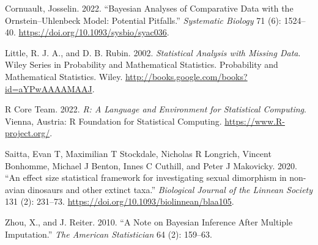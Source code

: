 \documentclass[
  12pt,
]{article}
\newlength{\cslhangindent}
\newlength{\cslentryspacingunit} %
\newenvironment{CSLReferences}[2] %
 {%
  \setlength{\parindent}{0pt}
  \ifodd #1
  \let\oldpar\par
  \def\par{\hangindent=\cslhangindent\oldpar}
  \fi
  \setlength{\parskip}{#2\cslentryspacingunit}
 }%
 {}
\begin{document}
\hypertarget{refs}{}
\begin{CSLReferences}{1}{0}
\leavevmode{}%
Cornuault, Josselin. 2022. {``{Bayesian Analyses of Comparative Data
with the Ornstein--Uhlenbeck Model: Potential Pitfalls}.''}
\emph{Systematic Biology} 71 (6): 1524--40.
\url{https://doi.org/10.1093/sysbio/syac036}.

\leavevmode{}%
Little, R. J. A., and D. B. Rubin. 2002. \emph{Statistical Analysis with
Missing Data}. Wiley Series in Probability and Mathematical Statistics.
Probability and Mathematical Statistics. Wiley.
\url{http://books.google.com/books?id=aYPwAAAAMAAJ}.

\leavevmode{}%
R Core Team. 2022. \emph{R: A Language and Environment for Statistical
Computing}. Vienna, Austria: R Foundation for Statistical Computing.
\url{https://www.R-project.org/}.

\leavevmode{}%
Saitta, Evan T, Maximilian T Stockdale, Nicholas R Longrich, Vincent
Bonhomme, Michael J Benton, Innes C Cuthill, and Peter J Makovicky.
2020. {``{An effect size statistical framework for investigating sexual
dimorphism in non-avian dinosaurs and other extinct taxa}.''}
\emph{Biological Journal of the Linnean Society} 131 (2): 231--73.
\url{https://doi.org/10.1093/biolinnean/blaa105}.

\leavevmode{}%
Zhou, X., and J. Reiter. 2010. {``A Note on Bayesian Inference After
Multiple Imputation.''} \emph{The American Statistician} 64 (2):
159--63.

\end{CSLReferences}
\end{document}

